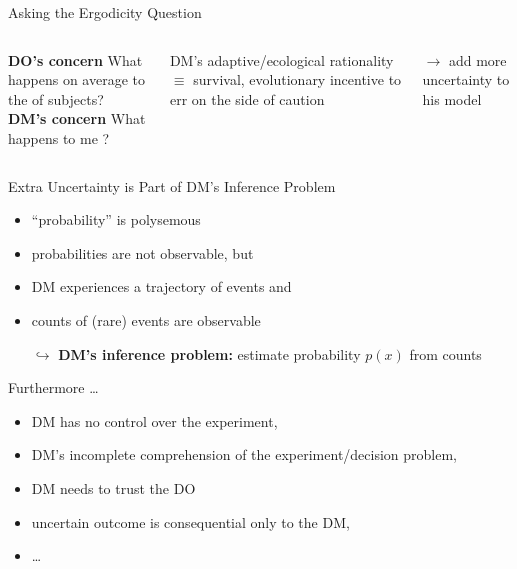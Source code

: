 \begin{frame}{Asking the Ergodicity Question}
\begin{columns}[T]
	\bc \textbf{DO's concern} \ec
	What happens on average to the  of subjects?
\centering \vspace{3em} \\ \red{\large $\neq$}
	\bc \textbf{DM's concern} \ec
	What happens to me ?
	\bi
	  \item DM's adaptive/ecological rationality $\equiv$ survival, \ie evolutionary incentive to err on the side of caution
	  \item[$\rightarrow$] add more uncertainty to his model
	\ei
\end{columns}
\end{frame}


\begin{frame}{Extra Uncertainty is Part of DM's Inference Problem}
\begin{itemize}
	\item ``probability'' is polysemous 
  \item probabilities are not observable, but
  \item DM experiences a trajectory of events and 
  \item counts of (rare) events are observable
  \item[$\hookrightarrow$] \textbf{DM's inference problem:} estimate probability $p(x)$ from counts
\end{itemize}

\vspace{1em}
Furthermore \ldots
\begin{itemize}
  \item DM has no control over the experiment,
	\item DM's incomplete comprehension of the experiment/decision problem,
	\item DM needs to trust the DO
	\item uncertain outcome is consequential only to the DM,
	\item \ldots
\end{itemize}
\end{frame}

